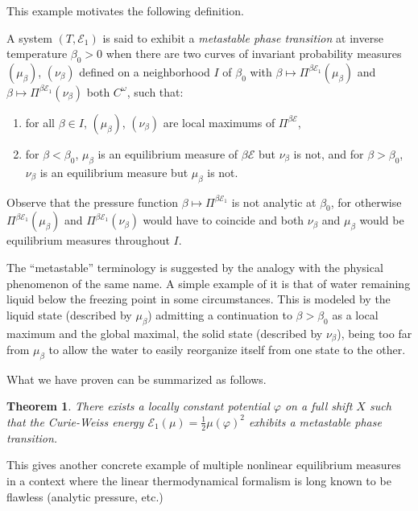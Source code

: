 \documentclass[AHL, Unicode, longabstracts,published]{cedram}
\theoremstyle{plain}
\newtheorem{theol}{Theorem}
\theoremstyle{plain}
\newcommand\NLP{\Pi}
\newcommand{\pot}{\varphi}
\newcommand*\8{\infty}
\newcommand{\En}{\mathcal{E}}
\newcommand*{\romanenumi}{\renewcommand*{\theenumi}{\roman{enumi}}}
\begin{document}
This example motivates the following definition.


\begin{defi}
A system $(T,\En_1)$ is said to exhibit a \emph{metastable phase transition} at inverse temperature $\beta_0>0$ when there are two curves of invariant probability measures $(\mu_\beta)$, $(\nu_\beta)$ defined on a neighborhood $I$ of $\beta_0$ with $\beta\mapsto \NLP^{\beta\En_1}(\mu_\beta)$ and $\beta \mapsto \NLP^{\beta\En_1}(\nu_\beta)$ both $C^\omega$, such that:
\begin{enumerate}\romanenumi
\item for all $\beta\in I$, $(\mu_\beta)$, $(\nu_\beta)$ are local maximums of $\NLP^{\beta\En}$,
\item for $\beta<\beta_0$, $\mu_\beta$ is an equilibrium measure of $\beta\En$ but $\nu_\beta$ is not, and for $\beta>\beta_0$, $\nu_\beta$ is an equilibrium measure but $\mu_\beta$ is not.
\end{enumerate}
\end{defi}

Observe that the pressure function $\beta\mapsto \NLP^{\beta\En_1}$ is not analytic at $\beta_0$, for otherwise $\NLP^{\beta\En_1}(\mu_\beta)$ and $\NLP^{\beta\En_1}(\nu_\beta)$ would have to coincide and both $\nu_\beta$ and $\mu_\beta$ would be equilibrium measures throughout $I$.

The ``metastable'' terminology is suggested by the analogy with the physical phenomenon of the same name. A simple example of it is that of water remaining liquid below the freezing point in some circumstances. This is modeled by the liquid state (described by $\mu_\beta$) admitting a continuation to $\beta>\beta_0$ as a local maximum and the global maximal, the solid state (described by $\nu_\beta$), being too far from $\mu_\beta$ to allow the water to easily reorganize itself from one state to the other. 


What we have proven can be summarized as follows.

\begin{theol}\label{th-metastable}
There exists a locally constant potential $\pot$ on a full shift $X$ such that the Curie-Weiss energy $\En_1(\mu) = \frac12 \mu(\pot)^2$ exhibits a metastable phase transition.
\end{theol}

This gives another concrete example of multiple nonlinear equilibrium measures in a context where the linear thermodynamical formalism is long known to be flawless (analytic pressure, etc.)
\end{document}
